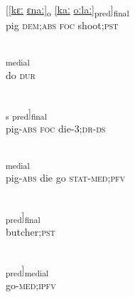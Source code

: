\documentclass[output=paper]{LSP/langsci}
\begin{document}
\begin{appendixexe}
 \ex \label{Aiex:App43}
\gll \underline{[[kɛː}	\underline{ɛnaː]\textsubscript{o}}	\underline{[kaː}	\underline{oːlaː]}\textsubscript{pred}]\textsubscript{final}\\
pig	\textsc{dem};\textsc{abs}	\textsc{foc}	shoot;\textsc{pst}\\
\glt {}\\
\end{appendixexe}

\begin{appendixexe}
 \ex \label{Aiex:App44}
\textsubscript{medial}\\
do	\textsc{dur}\\
\glt {}\\
\end{appendixexe}

\begin{appendixexe}
 \ex \label{Aiex:App45}
\gll \underline{\smash{[[kɛː-jaː]}}\textsubscript{s}	\underline{\smash{[kaː}}	\underline{\smash{ɡuːduː-saː-bi]}}\textsubscript{pred}]\textsubscript{final}\\
pig-\textsc{abs}	\textsc{foc}	die-\textsc{3;dr}-\textsc{ds}\\
\glt {}\\
\end{appendixexe}

\begin{appendixexe}
 \ex \label{Aiex:App46}
\textsubscript{medial}\\
pig-\textsc{abs}	die	go	\textsc{stat}-\textsc{med};\textsc{pfv}\\
\glt {}\\
\end{appendixexe}

\begin{appendixexe}
 \ex \label{Aiex:App47}
\gll [[joːlaː]\textsubscript{pred}]\textsubscript{final}\\
butcher;\textsc{pst}\\
\glt {}\\
\end{appendixexe}

\begin{appendixexe}
 \ex \label{Aiex:App48}
\gll [[hɛnaː-nɛː]\textsubscript{pred}]\textsubscript{medial}\\
go-\textsc{med};\textsc{ipfv}\\
\glt {}\\
\end{appendixexe}
\end{document}
